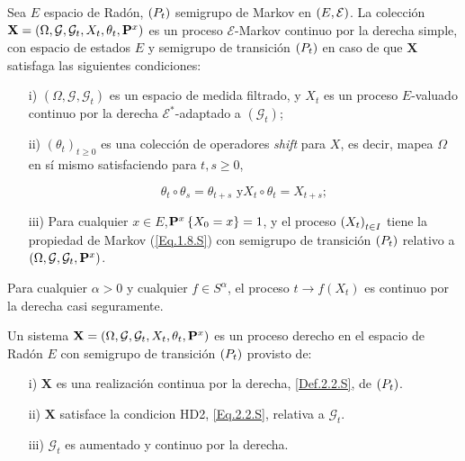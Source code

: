 \begin{Def}\label{Def.2.2.S}
Sea $E$ espacio de Rad\'on, $\left(P_{t}\right)$ semigrupo de Markov en $\left(E,\mathcal{E}\right)$. La
colecci\'on
$\mathbf{X}=\left(\Omega,\mathcal{G},\mathcal{G}_{t},X_{t},\theta_{t},\mathbf{P}^{x}\right)$
es un proceso $\mathcal{E}$-Markov continuo por la derecha simple,
con espacio de estados $E$ y semigrupo de transici\'on $\left(P_{t}\right)$ en
caso de que $\mathbf{X}$ satisfaga las siguientes condiciones:
\begin{itemize}
\item[i)] $\left(\Omega,\mathcal{G},\mathcal{G}_{t}\right)$ es un
espacio de medida filtrado, y $X_{t}$ es un proceso $E$-valuado
continuo por la derecha $\mathcal{E}^{*}$-adaptado a
$\left(\mathcal{G}_{t}\right)$;

\item[ii)] $\left(\theta_{t}\right)_{t\geq0}$ es una colecci\'on
de operadores {\em shift} para $X$, es decir, mapea $\Omega$ en
s\'i mismo satisfaciendo para $t,s\geq0$,

\begin{equation}\label{Eq.Shift}
\theta_{t}\circ\theta_{s}=\theta_{t+s}\textrm{ y
}X_{t}\circ\theta_{t}=X_{t+s};
\end{equation}

\item[iii)] Para cualquier $x\in E$,$\mathbf{P}^{x}\left\{X_{0}=x\right\}=1$,
y el proceso $\left(X_{t}\right)_{t\in I}$ tiene la propiedad de Markov (\ref{Eq.1.8.S})
con semigrupo de transici\'on $\left(P_{t}\right)$ relativo a
$\left(\Omega,\mathcal{G},\mathcal{G}_{t},\mathbf{P}^{x}\right)$.
\end{itemize}
\end{Def}

\begin{Def}[HD2]\label{Eq.2.2.S}
Para cualquier $\alpha>0$ y cualquier $f\in S^{\alpha}$, el
proceso $t\rightarrow f\left(X_{t}\right)$ es continuo por la
derecha casi seguramente.
\end{Def}

\begin{Def}\label{Def.PD}
Un sistema
$\mathbf{X}=\left(\Omega,\mathcal{G},\mathcal{G}_{t},X_{t},\theta_{t},\mathbf{P}^{x}\right)$
es un proceso derecho en el espacio de Rad\'on $E$ con semigrupo
de transici\'on $\left(P_{t}\right)$ provisto de:
\begin{itemize}
\item[i)] $\mathbf{X}$ es una realizaci\'on  continua por la
derecha, \ref{Def.2.2.S}, de $\left(P_{t}\right)$.

\item[ii)] $\mathbf{X}$ satisface la condicion HD2,
\ref{Eq.2.2.S}, relativa a $\mathcal{G}_{t}$.

\item[iii)] $\mathcal{G}_{t}$ es aumentado y continuo por la
derecha.
\end{itemize}
\end{Def}

